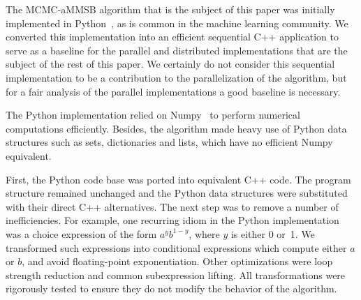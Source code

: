 The MCMC-aMMSB algorithm that is the subject of this paper was initially
implemented in Python~\cite{LiAW15}, as is common
in the machine learning community.
We converted this implementation into an efficient sequential C++ application
to serve as a baseline for the parallel and distributed implementations that
are the subject of the rest of this paper.
We certainly do not consider this sequential implementation to be a contribution to the parallelization
of the algorithm, but for a fair analysis of the parallel implementations
a good baseline is necessary.

The Python implementation
relied on Numpy~\cite{numpy} to perform numerical computations efficiently.
Besides, the algorithm
made heavy use of Python data structures such as sets, dictionaries and
lists, which have no efficient Numpy equivalent.

First, the Python code base was ported into equivalent C++ code.
The program structure remained unchanged and the Python data structures were
substituted with their direct C++ alternatives.
%
The next step was to remove a number of inefficiencies.
For example, one recurring idiom in the Python implementation
was a choice expression of the form $a^y b^{1-y}$, where $y$ is either 0 or~1.
We transformed such expressions into conditional expressions which
compute either $a$ or $b$, and avoid floating-point exponentiation.
%
Other optimizations were loop strength
reduction and common subexpression lifting.
%
All transformations were rigorously tested to ensure they do
not modify the behavior of the algorithm.
%
\begin{comment}
Further, we replaced calls to the system's random
functions with a custom implementation of the random generator
\textit{xorshift\_128}~\cite{Marsaglia:2003:XR}. This way, random calls no longer
involve system calls, so we can support easy and fast multi-threaded random
calls by providing each thread with its private, differently seeded, random
generator.
\end{comment}
